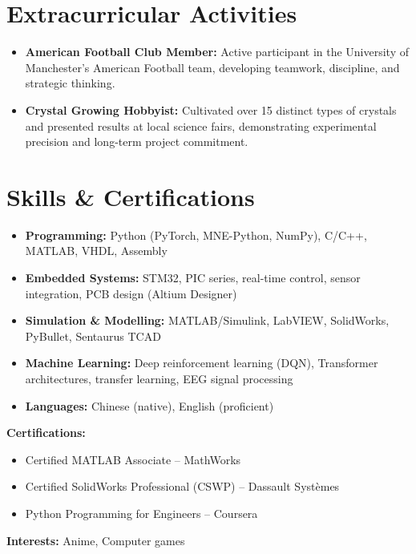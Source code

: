 \documentclass[11pt, a4paper]{article}
\begin{document}
\section{Extracurricular Activities}
\begin{itemize}[leftmargin=*, nosep, topsep=2pt]
    \item \textbf{American Football Club Member:} Active participant in the University of Manchester's American Football team, developing teamwork, discipline, and strategic thinking.
    \item \textbf{Crystal Growing Hobbyist:} Cultivated over 15 distinct types of crystals and presented results at local science fairs, demonstrating experimental precision and long-term project commitment.
\end{itemize}

\section{Skills \& Certifications}
\begin{itemize}[leftmargin=*, nosep, topsep=2pt]
    \item \textbf{Programming:} Python (PyTorch, MNE-Python, NumPy), C/C++, MATLAB, VHDL, Assembly
    \item \textbf{Embedded Systems:} STM32, PIC series, real-time control, sensor integration, PCB design (Altium Designer)
    \item \textbf{Simulation \& Modelling:} MATLAB/Simulink, LabVIEW, SolidWorks, PyBullet, Sentaurus TCAD
    \item \textbf{Machine Learning:} Deep reinforcement learning (DQN), Transformer architectures, transfer learning, EEG signal processing
    \item \textbf{Languages:} Chinese (native), English (proficient)
\end{itemize}

\vspace{4pt}
\textbf{Certifications:}
\begin{itemize}[leftmargin=*, nosep, topsep=2pt]
    \item Certified MATLAB Associate -- MathWorks
    \item Certified SolidWorks Professional (CSWP) -- Dassault Systèmes
    \item Python Programming for Engineers -- Coursera
\end{itemize}

\vspace{6pt}
\textbf{Interests:} Anime, Computer games
\end{document}
